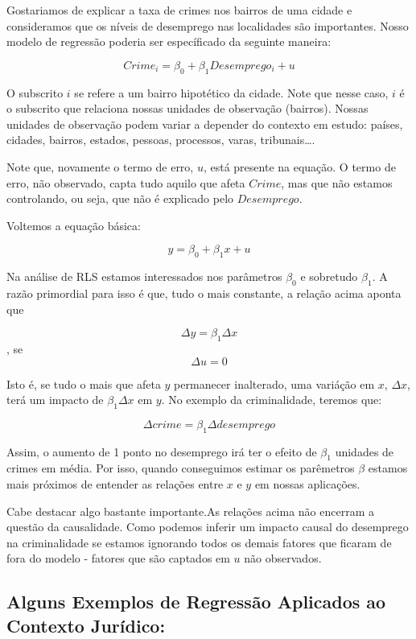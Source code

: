 \documentclass[
  letterpaper,
  DIV=11,
  numbers=noendperiod]{scrreprt}
\begin{document}
Gostariamos de explicar a taxa de crimes nos bairros de uma cidade e
consideramos que os níveis de desemprego nas localidades são
importantes. Nosso modelo de regressão poderia ser específicado da
seguinte maneira:

\[Crime_i = \beta_0 + \beta_1Desemprego_i + u\]

O subscrito \(i\) se refere a um bairro hipotético da cidade. Note que
nesse caso, \(i\) é o subscrito que relaciona nossas unidades de
observação (bairros). Nossas unidades de observação podem variar a
depender do contexto em estudo: países, cidades, bairros, estados,
pessoas, processos, varas, tribunais\ldots.

Note que, novamente o termo de erro, \(u\), está presente na equação. O
termo de erro, não observado, capta tudo aquilo que afeta \(Crime\), mas
que não estamos controlando, ou seja, que não é explicado pelo
\(Desemprego\).

Voltemos a equação básica:

\[y = \beta_0 + \beta_1x + u \]

Na análise de RLS estamos interessados nos parâmetros \(\beta_0\) e
sobretudo \(\beta_1\). A razão primordial para isso é que, tudo o mais
constante, a relação acima aponta que

\[\Delta y = \beta_1 \Delta x \] , se \[\Delta u = 0\]

Isto é, se tudo o mais que afeta \(y\) permanecer inalterado, uma
variáção em \(x\), \(\Delta x\), terá um impacto de \(\beta_1 \Delta x\)
em \(y\). No exemplo da criminalidade, teremos que:

\[\Delta crime = \beta_1 \Delta desemprego \]

Assim, o aumento de 1 ponto no desemprego irá ter o efeito de
\(\beta_1\) unidades de crimes em média. Por isso, quando conseguimos
estimar os parêmetros \(\beta\) estamos mais próximos de entender as
relações entre \(x\) e \(y\) em nossas aplicações.

Cabe destacar algo bastante importante.As relações acima não encerram a
questão da causalidade. Como podemos inferir um impacto causal do
desemprego na criminalidade se estamos ignorando todos os demais fatores
que ficaram de fora do modelo - fatores que são captados em \(u\) não
observados.

\subsection{Alguns Exemplos de Regressão Aplicados ao Contexto
Jurídico:}\label{alguns-exemplos-de-regressuxe3o-aplicados-ao-contexto-juruxeddico}
\end{document}
